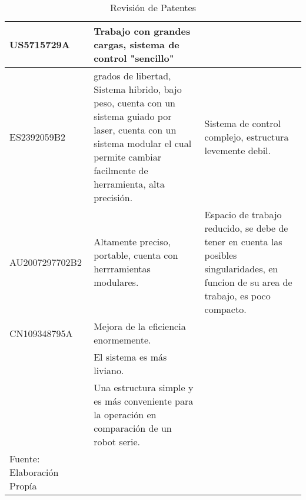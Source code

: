 \begin{longtable}{|>{\columncolor[gray]{0.85}}p{}|p{}|p{}|}
US5715729A & Trabajo con grandes cargas, sistema de control "sencillo" & \\ \cline{1-3}

ES2392059B2 &  grados de libertad, Sistema hibrido, bajo peso, cuenta con un sistema guiado por laser, cuenta con un sistema modular el cual permite cambiar facilmente de herramienta, alta precisión.
 & Sistema de control complejo, estructura levemente debil.  \\ \cline{1-3}

AU2007297702B2 & Altamente preciso, portable, cuenta con herrramientas modulares. & Espacio de trabajo reducido, se debe de tener en cuenta las posibles singularidades, en funcion de su area de trabajo, es poco compacto.\\ \cline{1-3}


CN109348795A & Mejora de la eficiencia enormemente. & \\
 & El sistema es más liviano. & \\
 & Una estructura simple y es más conveniente para la operación en comparación de un robot serie. & \\ \cline{1-3}
 
\caption{Revisión de Patentes}{Fuente: Elaboración Propía}
\label{table:PatentRevision}
\end{longtable}